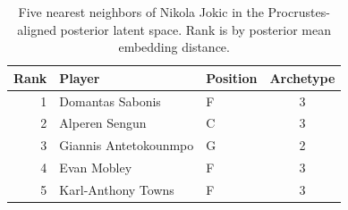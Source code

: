 \begin{table}[htbp]
  \centering\small
  \begin{tabular}{rllc}
    \toprule
    Rank & Player & Position & Archetype \\
    \midrule
    1 & Domantas Sabonis & F & 3 \\
    2 & Alperen Sengun & C & 3 \\
    3 & Giannis Antetokounmpo & G & 2 \\
    4 & Evan Mobley & F & 3 \\
    5 & Karl-Anthony Towns & F & 3 \\
    \bottomrule
  \end{tabular}
  \caption{Five nearest neighbors of Nikola Jokic in the Procrustes-aligned posterior latent space. Rank is by posterior mean embedding distance.}
  \label{tab:Nikola_Jokic_neighbors}
\end{table}

